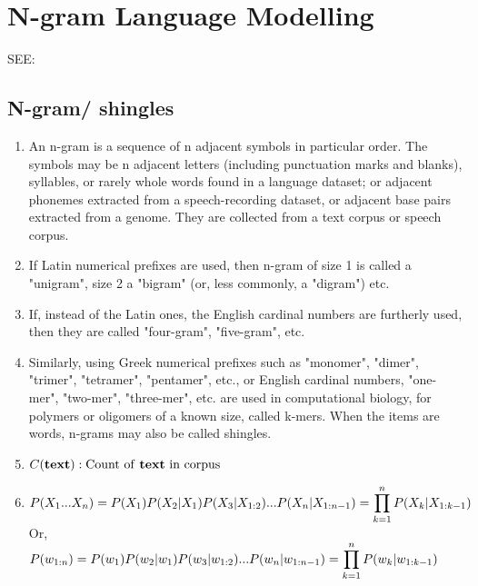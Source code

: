 \chapter{N-gram Language Modelling}

SEE: 


\section{N-gram/ shingles \cite{wiki-n-gram}}

\begin{enumerate}
    \item An n-gram is a sequence of n adjacent symbols in particular order. The symbols may be n adjacent letters (including punctuation marks and blanks), syllables, or rarely whole words found in a language dataset; or adjacent phonemes extracted from a speech-recording dataset, or adjacent base pairs extracted from a genome. They are collected from a text corpus or speech corpus.
    
    \item If Latin numerical prefixes are used, then n-gram of size 1 is called a "unigram", size 2 a "bigram" (or, less commonly, a "digram") etc.

    \item If, instead of the Latin ones, the English cardinal numbers are furtherly used, then they are called "four-gram", "five-gram", etc.

    \item Similarly, using Greek numerical prefixes such as "monomer", "dimer", "trimer", "tetramer", "pentamer", etc., or English cardinal numbers, "one-mer", "two-mer", "three-mer", etc. are used in computational biology, for polymers or oligomers of a known size, called k-mers. When the items are words, n-grams may also be called shingles.

    \item[] $C(\text{\textbf{text}}) : \text{Count of \textbf{text} in corpus}$

    \item[] $
        P(X_1...X_n) = P(X_1)P(X_2|X_1)P(X_3|X_{1:2})...P(X_n|X_{1:n-1}) = \displaystyle\prod_{k=1}^{n} P(X_k|X_{1:k-1}) 
    $\\
    Or,\\
    $
        P(w_{1:n}) = P(w_1)P(w_2|w_1)P(w_3|w_{1:2})...P(w_n|w_{1:n-1}) = \displaystyle\prod_{k=1}^{n} P(w_k|w_{1:k-1}) 
    $

\end{enumerate}


